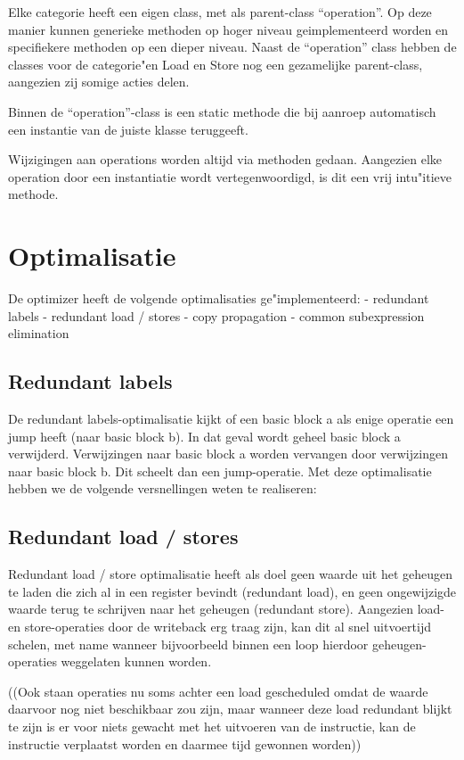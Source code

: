 \documentclass[a4paper,10pt]{article}
\begin{document}
Elke categorie heeft een eigen class, met als parent-class ``operation''. 
Op deze manier kunnen generieke methoden op hoger niveau geimplementeerd 
worden en specifiekere methoden op een dieper niveau. Naast de ``operation''
class hebben de classes voor de categorie"en Load en Store nog een 
gezamelijke parent-class, aangezien zij somige acties delen.

Binnen de ``operation''-class is een static methode die bij aanroep 
automatisch een instantie van de juiste klasse teruggeeft.

Wijzigingen aan operations worden altijd via methoden gedaan. Aangezien elke
operation door een instantiatie wordt vertegenwoordigd, is dit een vrij
intu"itieve methode.


\section{Optimalisatie}
De optimizer heeft de volgende optimalisaties ge"implementeerd:
- redundant labels
- redundant load / stores
- copy propagation
- common subexpression elimination

\subsection{Redundant labels}
De redundant labels-optimalisatie kijkt of een basic block a als enige
operatie een jump heeft (naar basic block b). In dat geval wordt geheel basic
block a verwijderd. Verwijzingen naar basic block a worden vervangen door
verwijzingen naar basic block b. Dit scheelt dan een jump-operatie.
Met deze optimalisatie hebben we de volgende versnellingen weten te 
realiseren:

\subsection{Redundant load / stores}
Redundant load / store optimalisatie heeft als doel geen waarde uit het 
geheugen te laden die zich al in een register bevindt (redundant load), en 
geen ongewijzigde waarde terug te schrijven naar het geheugen (redundant 
store). Aangezien load- en store-operaties door de writeback erg traag 
zijn, kan dit al snel uitvoertijd schelen, met name wanneer bijvoorbeeld 
binnen een loop hierdoor geheugen-operaties weggelaten kunnen worden.

((Ook staan operaties nu soms achter een load
gescheduled omdat de waarde daarvoor nog niet beschikbaar zou zijn, maar
wanneer deze load redundant blijkt te zijn is er voor niets gewacht met het
uitvoeren van de instructie, kan de instructie verplaatst worden en daarmee
tijd gewonnen worden))
\end{document}
